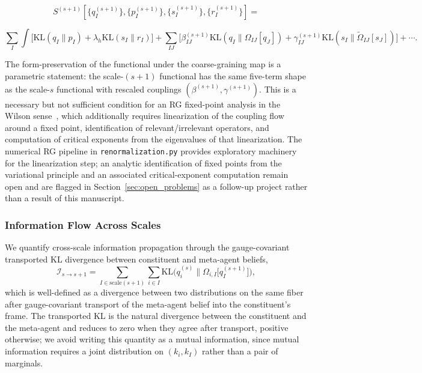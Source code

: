 \documentclass[11pt]{article}
\begin{document}
\begin{equation}
S^{(s+1)}[\{q_I^{(s+1)}\}, \{p_I^{(s+1)}\}, \{s_I^{(s+1)}\}, \{r_I^{(s+1)}\}] = 
\end{equation}

\begin{equation}
\sum_I \int \big[\mathrm{KL}(q_I \| p_I) + \lambda_h\mathrm{KL}(s_I \| r_I)\big] + \sum_{IJ} \big[\beta_{IJ}^{(s+1)} \mathrm{KL}(q_I \| \Omega_{IJ}[q_J]) + \gamma_{IJ}^{(s+1)} \mathrm{KL}(s_I \| \tilde\Omega_{IJ}[s_J])\big] + \cdots.
\end{equation}

The form-preservation of the functional under the coarse-graining map is a parametric statement: the scale-$(s{+}1)$ functional has the same five-term shape as the scale-$s$ functional with rescaled couplings $(\beta^{(s+1)}, \gamma^{(s+1)})$. This is a necessary but not sufficient condition for an RG fixed-point analysis in the Wilson sense~\cite{Wilson1974}, which additionally requires linearization of the coupling flow around a fixed point, identification of relevant/irrelevant operators, and computation of critical exponents from the eigenvalues of that linearization. The numerical RG pipeline in \texttt{renormalization.py} provides exploratory machinery for the linearization step; an analytic identification of fixed points from the variational principle and an associated critical-exponent computation remain open and are flagged in Section~\ref{sec:open_problems} as a follow-up project rather than a result of this manuscript.

\subsubsection{Information Flow Across Scales}

We quantify cross-scale information propagation through the gauge-covariant transported KL divergence between constituent and meta-agent beliefs,
\begin{equation}
\mathcal{I}_{s \to s+1} = \sum_{I \in \mathrm{scale}(s+1)} \sum_{i \in I} \mathrm{KL}\big(q_i^{(s)} \big\| \Omega_{i,I}\big[q_I^{(s+1)}\big]\big),
\label{eq:cross_scale_information_flow}
\end{equation}
which is well-defined as a divergence between two distributions on the same fiber after gauge-covariant transport of the meta-agent belief into the constituent's frame. The transported KL is the natural divergence between the constituent and the meta-agent and reduces to zero when they agree after transport, positive otherwise; we avoid writing this quantity as a mutual information, since mutual information requires a joint distribution on $(k_i, k_I)$ rather than a pair of marginals.
\end{document}
